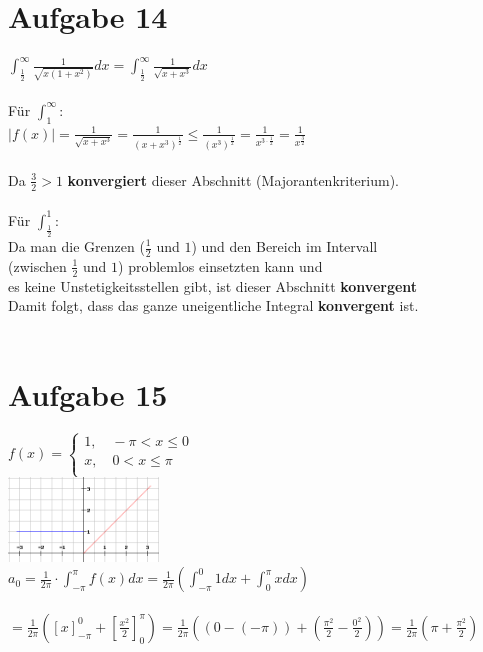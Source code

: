\documentclass[12pt,a4paper]{article}
\begin{document}
\section*{Aufgabe 14}
$\int_\frac{1}{2}^\infty \frac{1}{\sqrt{x(1+x^2)}}dx = \int_\frac{1}{2}^\infty \frac{1}{\sqrt{x+x^3}}dx$\\
\\
Für $\int_1^\infty$:\\
$|f(x)|=\frac{1}{\sqrt{x+x^3}} = \frac{1}{(x+x^3)^\frac{1}{2}}\leq \frac{1}{(x^3)^\frac{1}{2}}=\frac{1}{x^{3\cdot \frac{1}{2}}}= \frac{1}{x^\frac{3}{2}}$\\
\\
Da $\frac{3}{2} > 1$ \textbf{konvergiert} dieser Abschnitt (Majorantenkriterium).\\
\\
Für $\int_\frac{1}{2}^1$:\\
Da man die Grenzen ($\frac{1}{2}$ und $1$) und den Bereich im Intervall \\
(zwischen $\frac{1}{2}$ und $1$) problemlos einsetzten kann und \\ 
es keine Unstetigkeitsstellen gibt, ist dieser Abschnitt \textbf{konvergent}\\
Damit folgt, dass das ganze uneigentliche Integral \textbf{konvergent} ist.\\
\\
\section*{Aufgabe 15}
$f(x)=\begin{cases}
               1,\quad -\pi < x \leq 0\\
               x,\quad 0 < x \leq \pi\\
        \end{cases}$\\
\includegraphics[width=0.3\textwidth]{skizze.png}
\\
$a_0=\frac{1}{2\pi}\cdot \int_{-\pi}^\pi f(x)dx = \frac{1}{2\pi}(\int_{-\pi}^0 1dx+\int_0^\pi xdx)$\\
\\
$=\frac{1}{2\pi}(\left[x\right]_{-\pi}^0+\left[\frac{x^2}{2}\right]_{0}^\pi)=\frac{1}{2\pi}((0-(-\pi))+(\frac{\pi^2}{2}-\frac{0^2}{2}))=\frac{1}{2\pi}(\pi+\frac{\pi^2}{2})$\\
\end{document}
